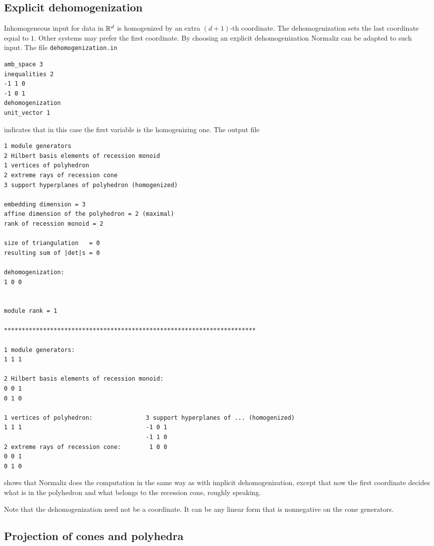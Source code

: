 \subsection{Explicit dehomogenization}\label{dehom_ex}
Inhomogeneous input for data in ${\mathbb R}^{d}$ is homogenized by an extra $(d+1)$-th coordinate. The dehomogenization sets the last coordinate equal to $1$. Other systems may prefer the first coordinate. By choosing an explicit dehomogenization Normaliz can be adapted to such input. The file \verb|dehomogenization.in|
\begin{Verbatim}
amb_space 3
inequalities 2
-1 1 0
-1 0 1
dehomogenization
unit_vector 1
\end{Verbatim}
indicates that in this case the first variable is the homogenizing one. The output file
\begin{Verbatim}
1 module generators
2 Hilbert basis elements of recession monoid
1 vertices of polyhedron
2 extreme rays of recession cone
3 support hyperplanes of polyhedron (homogenized)

embedding dimension = 3
affine dimension of the polyhedron = 2 (maximal)
rank of recession monoid = 2

size of triangulation   = 0
resulting sum of |det|s = 0

dehomogenization:
1 0 0 


module rank = 1

***********************************************************************

1 module generators:
1 1 1

2 Hilbert basis elements of recession monoid:
0 0 1
0 1 0

1 vertices of polyhedron:               3 support hyperplanes of ... (homogenized)
1 1 1                                   -1 0 1
                                        -1 1 0
2 extreme rays of recession cone:        1 0 0
0 0 1
0 1 0
\end{Verbatim}
shows that Normaliz does the computation in the same way as with implicit dehomogenization, except that now the first coordinate decides what is in the polyhedron and what belongs to the recession cone, roughly speaking.

Note that the dehomogenization need not be a coordinate. It can be any linear form that is nonnegative on the cone generators.

\subsection{Projection of cones and polyhedra}\label{Proj_cone}

